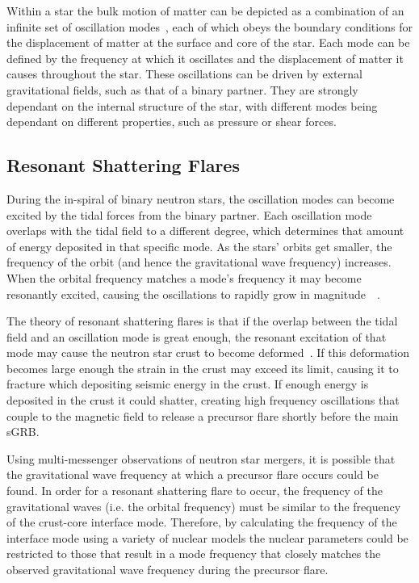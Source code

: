 \documentclass[fleqn,usenatbib]{mnras}
\begin{document}
\hspace{\parindent}Within a star the bulk motion of matter can be depicted as a combination of an infinite set of oscillation modes~\cite{smeyers2011linear}, each of which obeys the boundary conditions for the displacement of matter at the surface and core of the star. Each mode can be defined by the frequency at which it oscillates and the displacement of matter it causes throughout the star. These oscillations can be driven by external gravitational fields, such as that of a binary partner. They are strongly dependant on the internal structure of the star, with different modes being dependant on different properties, such as pressure or shear forces.








\subsection{Resonant Shattering Flares}
\hspace{\parindent}During the in-spiral of binary neutron stars, the oscillation modes can become excited by the tidal forces from the binary partner. Each oscillation mode overlaps with the tidal field to a different degree, which determines that amount of energy deposited in that specific mode. As the stars' orbits get smaller, the frequency of the orbit (and hence the gravitational wave frequency) increases. When the orbital frequency matches a mode's frequency it may become resonantly excited, causing the oscillations to rapidly grow in magnitude~\cite{tsang2012resonant}~\cite{tsang2013shattering}.

\hspace{\parindent}The theory of resonant shattering flares is that if the overlap between the tidal field and an oscillation mode is great enough, the resonant excitation of that mode may cause the neutron star crust to become deformed~\cite{troja2010precursors}. If this deformation becomes large enough the strain in the crust may exceed its limit, causing it to fracture which depositing seismic energy in the crust. If enough energy is deposited in the crust it could shatter, creating high frequency oscillations that couple to the magnetic field to release a precursor flare shortly before the main sGRB.%

\hspace{\parindent}Using multi-messenger observations of neutron star mergers, it is possible that the gravitational wave frequency at which a precursor flare occurs could be found. In order for a resonant shattering flare to occur, the frequency of the gravitational waves (i.e. the orbital frequency) must be similar to the frequency of the crust-core interface mode. Therefore, by calculating the frequency of the interface mode using a variety of nuclear models the nuclear parameters could be restricted to those that result in a mode frequency that closely matches the observed gravitational wave frequency during the precursor flare.
\end{document}
